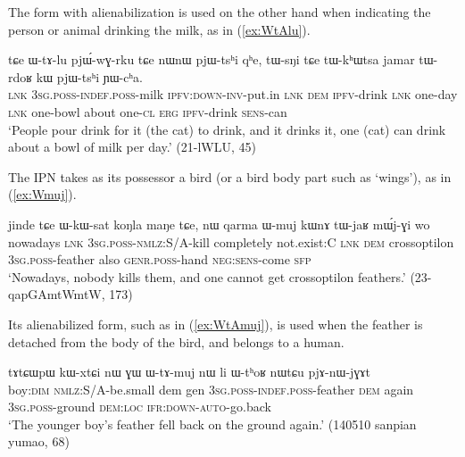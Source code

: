 The form  with alienabilization is used on the other hand when indicating the person or animal drinking the milk, as in (\ref{ex:WtAlu}).

  \begin{exe}
\ex \label{ex:WtAlu}
 \gll tɕe ɯ-tɤ-lu pjɯ́-wɣ-rku tɕe nɯnɯ pjɯ-tsʰi qʰe, tɯ-sŋi tɕe tɯ-kʰɯtsa jamar tɯ-rdoʁ kɯ pjɯ-tsʰi ɲɯ-cʰa. \\
\textsc{lnk} \textsc{3sg.poss}-\textsc{indef.poss}-milk \textsc{ipfv}:\textsc{down}-\textsc{inv}-put.in  \textsc{lnk} \textsc{dem} \textsc{ipfv}-drink \textsc{lnk} one-day \textsc{lnk} one-bowl about one-\textsc{cl} \textsc{erg} \textsc{ipfv}-drink \textsc{sens}-can \\
\glt `People pour drink for it (the cat) to drink, and it drinks it, one (cat) can drink about a bowl of milk per day.' (21-lWLU, 45)
  \end{exe}

The IPN  takes as its possessor a bird (or a bird body part such as `wings'), as in (\ref{ex:Wmuj}).

    \begin{exe}
\ex \label{ex:Wmuj}
 \gll   jinde tɕe ɯ-kɯ-sat koŋla maŋe tɕe, nɯ qarma ɯ-muj kɯnɤ tɯ-jaʁ mɯ́j-ɣi wo \\
 nowadays \textsc{lnk} \textsc{3sg.poss}-\textsc{nmlz}:S/A-kill completely not.exist:C \textsc{lnk} \textsc{dem} crossoptilon \textsc{3sg.poss}-feather also \textsc{genr.poss}-hand \textsc{neg}:\textsc{sens}-come \textsc{sfp} \\
 \glt `Nowadays, nobody kills them, and one cannot get crossoptilon feathers.' (23-qapGAmtWmtW, 173)
  \end{exe}

Its alienabilized form, such as  in (\ref{ex:WtAmuj}), is used when the feather is detached from the body of the bird, and belongs to a human.
  
\begin{exe}
\ex \label{ex:WtAmuj}
 \gll tɤtɕɯpɯ kɯ-xtɕi nɯ ɣɯ ɯ-tɤ-muj nɯ li ɯ-tʰoʁ nɯtɕu pjɤ-nɯ-jɣɤt  \\
 boy:\textsc{dim} \textsc{nmlz}:S/A-be.small dem gen \textsc{3sg.poss}-\textsc{indef.poss}-feather \textsc{dem} again \textsc{3sg.poss}-ground \textsc{dem:loc} \textsc{ifr}:\textsc{down}-\textsc{auto}-go.back  \\
 \glt `The younger boy's feather fell back on the ground again.' (140510 sanpian yumao, 68)
\end{exe}
 
